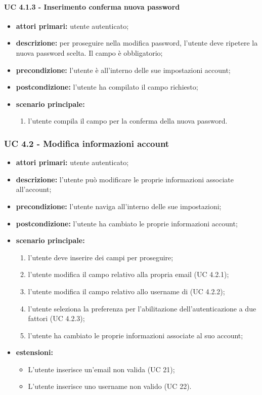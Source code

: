 				\paragraph{UC 4.1.3 - Inserimento conferma nuova password}
				\begin{itemize}
					\item \textbf{attori primari:} utente autenticato;
					\item \textbf{descrizione:} per proseguire nella modifica password, l'utente deve ripetere la nuova password scelta. Il campo è obbligatorio;
					\item \textbf{precondizione:} l'utente è all'interno delle sue impostazioni account;
					\item \textbf{postcondizione:} l'utente ha compilato il campo richiesto;
					\item \textbf{scenario principale:}
					\begin{enumerate}
						\item l'utente compila il campo per la conferma della nuova password.
					\end{enumerate}
				\end{itemize}

			\subsubsection{UC 4.2 - Modifica informazioni account}
			\begin{itemize}
				\item \textbf{attori primari:} utente autenticato;
				\item \textbf{descrizione:} l'utente può modificare le proprie informazioni associate all'account;
				\item \textbf{precondizione:} l'utente naviga all'interno delle sue impostazioni;
				\item \textbf{postcondizione:} l'utente ha cambiato le proprie informazioni account;
				\item \textbf{scenario principale:}
				\begin{enumerate}
					\item l'utente deve inserire dei campi per proseguire;
					\item l'utente modifica il campo relativo alla propria email (UC 4.2.1);
					\item l'utente modifica il campo relativo allo username di  (UC 4.2.2);
					\item l'utente seleziona la preferenza per l'abilitazione dell'autenticazione a due fattori (UC 4.2.3);
					\item l'utente ha cambiato le proprie informazioni associate al suo account;
				\end{enumerate}
				\item \textbf{estensioni:}
					\begin{itemize}
						\item L'utente inserisce un'email non valida (UC 21);
						\item L'utente inserisce uno username  non valido (UC 22).
					\end{itemize}
			\end{itemize}

